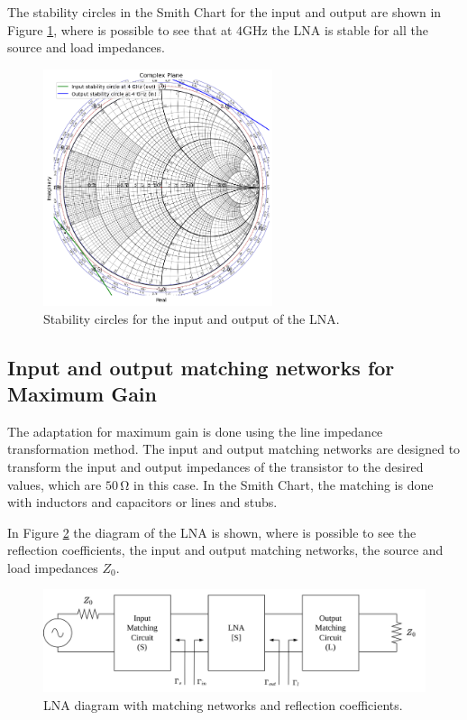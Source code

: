 The stability circles in the Smith Chart for the input and output are shown in Figure \ref{fig:StabilityCircles}, where is possible to see  that at $4\si{\giga\hertz}$ the LNA is stable for all the source and load impedances.

\begin{figure}[H]
    \centering
    \includegraphics[width=0.6\textwidth]{Images/stability-circles.png}
    \caption{Stability circles for the input and output of the LNA.}
    \label{fig:StabilityCircles}
\end{figure}

\subsection{Input and output matching networks for Maximum Gain}

The adaptation for maximum gain is done using the line impedance transformation method. The input and output matching networks are designed to transform the input and output impedances of the transistor to the desired values, which are $50\,\si{\ohm}$ in this case. In the Smith Chart, the matching is done with inductors and capacitors or lines and stubs.

In Figure \ref{fig:LNA-diagram} the diagram of the LNA is shown, where is possible to see the reflection coefficients, the input and output matching networks, the source and load impedances $Z_0$.

\begin{figure}[H]
    \centering
    \includegraphics[width=1\textwidth]{Images/LNA-diagram.png}
    \caption{LNA diagram with matching networks and reflection coefficients.}
    \label{fig:LNA-diagram}
\end{figure}

